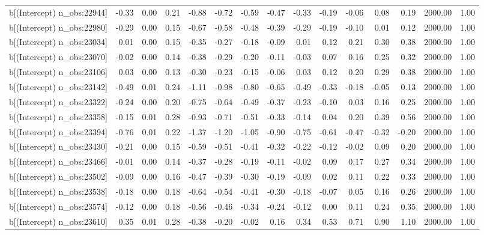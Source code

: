 \begin{table}[ht]
\begin{tabular}{rrrrrrrrrrrrrrr}
  b[(Intercept) n\_obs:22944] & -0.33 & 0.00 & 0.21 & -0.88 & -0.72 & -0.59 & -0.47 & -0.33 & -0.19 & -0.06 & 0.08 & 0.19 & 2000.00 & 1.00 \\ 
  b[(Intercept) n\_obs:22980] & -0.29 & 0.00 & 0.15 & -0.67 & -0.58 & -0.48 & -0.39 & -0.29 & -0.19 & -0.10 & 0.01 & 0.12 & 2000.00 & 1.00 \\ 
  b[(Intercept) n\_obs:23034] & 0.01 & 0.00 & 0.15 & -0.35 & -0.27 & -0.18 & -0.09 & 0.01 & 0.12 & 0.21 & 0.30 & 0.38 & 2000.00 & 1.00 \\ 
  b[(Intercept) n\_obs:23070] & -0.02 & 0.00 & 0.14 & -0.38 & -0.29 & -0.20 & -0.11 & -0.03 & 0.07 & 0.16 & 0.25 & 0.32 & 2000.00 & 1.00 \\ 
  b[(Intercept) n\_obs:23106] & 0.03 & 0.00 & 0.13 & -0.30 & -0.23 & -0.15 & -0.06 & 0.03 & 0.12 & 0.20 & 0.29 & 0.38 & 2000.00 & 1.00 \\ 
  b[(Intercept) n\_obs:23142] & -0.49 & 0.01 & 0.24 & -1.11 & -0.98 & -0.80 & -0.65 & -0.49 & -0.33 & -0.18 & -0.05 & 0.13 & 2000.00 & 1.00 \\ 
  b[(Intercept) n\_obs:23322] & -0.24 & 0.00 & 0.20 & -0.75 & -0.64 & -0.49 & -0.37 & -0.23 & -0.10 & 0.03 & 0.16 & 0.25 & 2000.00 & 1.00 \\ 
  b[(Intercept) n\_obs:23358] & -0.15 & 0.01 & 0.28 & -0.93 & -0.71 & -0.51 & -0.33 & -0.14 & 0.04 & 0.20 & 0.39 & 0.56 & 2000.00 & 1.00 \\ 
  b[(Intercept) n\_obs:23394] & -0.76 & 0.01 & 0.22 & -1.37 & -1.20 & -1.05 & -0.90 & -0.75 & -0.61 & -0.47 & -0.32 & -0.20 & 2000.00 & 1.00 \\ 
  b[(Intercept) n\_obs:23430] & -0.21 & 0.00 & 0.15 & -0.59 & -0.51 & -0.41 & -0.32 & -0.22 & -0.12 & -0.02 & 0.09 & 0.20 & 2000.00 & 1.00 \\ 
  b[(Intercept) n\_obs:23466] & -0.01 & 0.00 & 0.14 & -0.37 & -0.28 & -0.19 & -0.11 & -0.02 & 0.09 & 0.17 & 0.27 & 0.34 & 2000.00 & 1.00 \\ 
  b[(Intercept) n\_obs:23502] & -0.09 & 0.00 & 0.16 & -0.47 & -0.39 & -0.30 & -0.19 & -0.09 & 0.02 & 0.11 & 0.22 & 0.33 & 2000.00 & 1.00 \\ 
  b[(Intercept) n\_obs:23538] & -0.18 & 0.00 & 0.18 & -0.64 & -0.54 & -0.41 & -0.30 & -0.18 & -0.07 & 0.05 & 0.16 & 0.26 & 2000.00 & 1.00 \\ 
  b[(Intercept) n\_obs:23574] & -0.12 & 0.00 & 0.18 & -0.56 & -0.46 & -0.34 & -0.24 & -0.12 & 0.00 & 0.11 & 0.24 & 0.35 & 2000.00 & 1.00 \\ 
  b[(Intercept) n\_obs:23610] & 0.35 & 0.01 & 0.28 & -0.38 & -0.20 & -0.02 & 0.16 & 0.34 & 0.53 & 0.71 & 0.90 & 1.10 & 2000.00 & 1.00 \\ 

\end{tabular}
\end{table}
